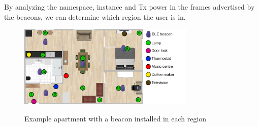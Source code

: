 By analyzing the namespace, instance and Tx power in the frames advertised by the beacons, we can determine which region the user is in.

\begin{figure}[h!]
\centering
\includegraphics[width=0.75\textwidth]{images/room-with-beacons}
\label{fig:design:ble-positioning:room}
\caption{Example apartment with a beacon installed in each region}
\end{figure}

